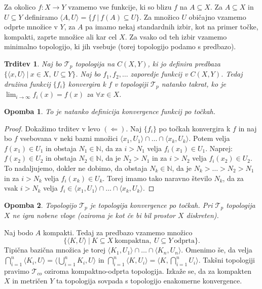 \documentclass[10pt, a4paper]{article}
\newtheorem{trditev}[izr]{Trditev}
\newtheorem*{opomba}{Opomba}
\newenvironment{noticeC}{%
  \tcolorbox[%
  notitle,
  empty,
  enhanced,  %
  breakable,
  coltext=black, 
  fontupper=\rmfamily,
  parbox=false,
  noparskip,
  sharp corners,
  boxrule=-1pt,  %
  frame hidden,
  left=7pt,  %
  right=7pt,
  top=5pt,
  bottom=5pt,
  before skip=2.5ex plus 2pt,
  after skip=2.5ex plus 2pt,
  overlay unbroken and last={%
  },
  ]}
{\endtcolorbox}
\newenvironment{dokaz}%
  {\begin{noticeC}\begin{proof}}%
  {\end{proof}\end{noticeC}}
\newcommand{\N}{\mathbb {N}}
\newcommand{\sprod}[2]{\langle {#1},{#2} \rangle}
\newcommand{\topo}[1]{\mathcal{#1}}
\begin{document}
Za okolico $f: X \to Y$ vzamemo vse funkcije, ki so blizu $f$ na $A \subseteq X$.
Za $A \subseteq X$ in $U \subseteq Y$ definiramo $\sprod{A}{U} = \{f\ |\ f(A) \subseteq U\}$.
Za množico $U$ običajno vzamemo odprte množice v $Y$, za $A$ pa imamo nekaj standardnih izbir, kot na primer 
točke, kompakti, zaprte množice ali kar cel $X$.
Za vsako od teh izbir vzamemo minimalno topologijo, ki jih vsebuje (torej topologijo podamo s predbazo).

\begin{trditev}
  Naj bo $\topo{T}_p$ topologija na $C(X, Y)$, ki jo definira predbaza $\{\sprod{x}{U}\ |\ x \in X,\ U \subseteq Y\}$.
  Naj bo $f_1, f_2, \dots$ zaporedje funkcij v $C(X, Y)$. Tedaj družina funkcij $\{f_i\}$ 
  konvergira k $f$ v topologiji $\topo{T}_p$ natanko takrat, ko je $\lim_{i \to \infty} f_i (x) = f(x)$ za $\forall x \in X$.
\end{trditev}

\begin{opomba}
  To je natanko definicija konvergence funkcij po točkah.
\end{opomba}

\begin{dokaz}
  Dokažimo trditev v levo $(\Leftarrow)$. Naj $\{f_i\}$ po točkah
  konvergira k $f$ in naj bo $f$ vsebovana v neki bazni množici $\sprod{x_1}{U_1} \cap \dots \cap \sprod{x_k}{U_k}$.
  Potem velja $f(x_1) \in U_1$ in obstaja $N_1 \in \N$, da za $i > N_1$ velja $f_i (x_1) \in U_1$.
  Naprej: $f(x_2) \in U_2$ in obstaja $N_2 \in \N$, da je $N_2 > N_1$ in za $i > N_2 $ velja $f_i (x_2) \in U_2$.
  To nadaljujemo, dokler ne dobimo, da obstaja $N_k \in \N$, da je $N_k > \dots > N_2 > N_1$ in za $i > N_k$ velja $f_i (x_k) \in U_k$.
  Torej imamo tako naravno število $N_k$, da za vsak $i > N_k$ velja $f_i \in \sprod{x_1}{U_1} \cap \dots \cap \sprod{x_k}{U_k}$.
\end{dokaz}

\begin{opomba}
  Topologijo $\topo{T}_p$ je topologija konvergence po točkah. Pri $\topo{T}_p$ topologija $X$ ne igra nobene vloge 
  (oziroma je kot če bi bil prostor $X$ diskreten).
\end{opomba}

Naj bodo $A$ kompakti. Tedaj za predbazo vzamemo množico $$\{\sprod{K}{U}\ |\ K \subseteq X\ \mathrm{\text{kompaktna}},\ U \subseteq Y\ \mathrm{\text{odprta}}\}.$$
Tipična bazična množica je torej $\sprod{K_1}{U_1} \cap \dots \cap \sprod{K_n}{U_n}$.
Omenimo še, da velja $\bigcap_{i = 1} ^n \sprod{K_i}{U} = \sprod{\bigcup_{i = 1} ^n K_i}{U}$ in 
$\bigcap_{i = 1} ^n \sprod{K}{U_i} = \sprod{K}{\bigcap_{i = 1} ^n U_i}$.
Takšni topologiji pravimo $\topo{T}_{co}$ oziroma kompaktno-odprta topologija.
Izkaže se, da za kompakten $X$ in metričen $Y$ ta topologija sovpada s topologijo enakomerne konvergence.
\end{document}
